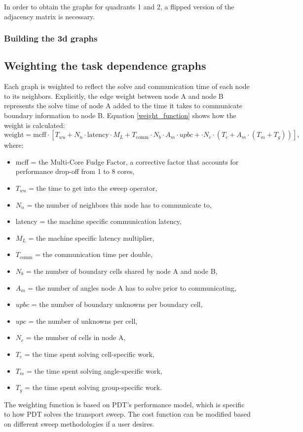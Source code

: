 In order to obtain the graphs for quadrants 1 and 2, a flipped version of the adjacency matrix is necessary.

\subsubsection{Building the 3d graphs}


\subsection{Weighting the task dependence graphs}

Each graph is weighted to reflect the solve and communication time of each node to its neighbors. Explicitly, the edge weight between node A and node B represents the solve time of node A added to the time it takes to communicate boundary information to node B. Equation \ref{weight_function} shows how the weight is calculated:
\begin{equation}
\text{weight} = \text{mcff}\cdot [T_{wu} + N_n\cdot \text{latency}\cdot M_L + T_{\text{comm}}\cdot N_b\cdot A_m\cdot upbc + \cdot N_c\cdot (T_c + A_m\cdot (T_m + T_g))],
\label{weight_function}
\end{equation}
where:
\begin{itemize}
  \item mcff = the Multi-Core Fudge Factor, a corrective factor that accounts for performance drop-off from 1 to 8 cores,
  \item $T_{wu}$ = the time to get into the sweep operator,
  \item $N_n$ = the number of neighbors this node has to communicate to,
  \item latency = the machine specific communication latency,
  \item $M_L$ = the machine specific latency multiplier,
  \item $T_{\text{comm}}$ = the communication time per double,
  \item $N_b$ = the number of boundary cells shared by node A and node B,
  \item $A_m$ = the number of angles node A has to solve prior to communicating,
  \item $upbc$ = the number of boundary unknowns per boundary cell,
  \item $upc$ = the number of unknowns per cell,
  \item $N_c$ = the number of cells in node A,
  \item $T_c$ = the time spent solving cell-specific work,
  \item $T_m$ = the time spent solving angle-specific work,
  \item $T_g$ = the time spent solving group-specific work.
\end{itemize}
The weighting function is based on PDT's performance model\cite{mpadams15}, which is specific to how PDT solves the transport sweep. The cost function can be modified based on different sweep methodologies if a user desires.

